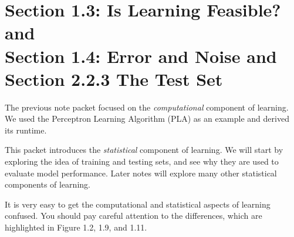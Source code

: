 \documentclass[10pt]{exam}
\theoremstyle{definition}
\newtheorem{problem}{Problem}
\newtheorem{note}{Note}
\DeclareMathOperator*{\argmin}{arg\,min}
\newcommand{\Eout}{E_{\text{out}}}
\newcommand{\x}{\mathbf x}
\begin{document}

\section*{Section 1.3: Is Learning Feasible? and \\ Section 1.4: Error and Noise and \\
Section 2.2.3 The Test Set}

    The previous note packet focused on the \emph{computational} component of learning.
    We used the Perceptron Learning Algorithm (PLA) as an example and derived its runtime.

    This packet introduces the \emph{statistical} component of learning.
    We will start by exploring the idea of training and testing sets,
    and see why they are used to evaluate model performance.
    Later notes will explore many other statistical components of learning.

    It is very easy to get the computational and statistical aspects of learning confused.
    You should pay careful attention to the differences, which are highlighted in Figure 1.2, 1.9, and 1.11.


\end{document}
